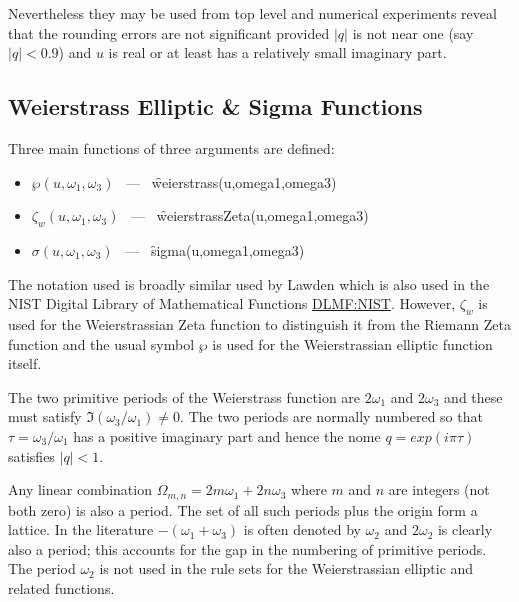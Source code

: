 Nevertheless they may be used from top level and numerical experiments reveal that the rounding
errors are not significant provided $|q|$ is not near one (say $|q|<0.9$)
and $u$ is real or at least has a relatively small imaginary part.

\subsection{Weierstrass Elliptic \& Sigma Functions}
Three main functions of three arguments are defined:
\hypertarget{WEIERSTRASS}{}
\hypertarget{WEIERSTRASSZETA}{}
\hypertarget{SIGMA}{}
\hypertarget{operator:SIGMA}{}
\hypertarget{operator:WEIERSTRASS}{}
\hypertarget{operator:WEIERSTRASSZETA}{}
 
\begin{itemize}
\item  $\wp(u, \omega_1, \omega_3)$ \ --- \ \f{weierstrass(u,omega1,omega3)}
\item $\zeta_w(u, \omega_1, \omega_3)$ \ --- \ \f{weierstrassZeta(u,omega1,omega3)}
\item $\sigma(u, \omega_1, \omega_3)$ \ --- \ \f{sigma(u,omega1,omega3)}
\end{itemize}

The notation used is broadly similar used by Lawden \cite{Lawden:89} which is also used in the
NIST Digital Library of Mathematical Functions \href{https://dlmf.nist.gov/}{DLMF:NIST}. However,
$\zeta_w$ is used for the Weierstrassian Zeta function to distinguish it from the Riemann Zeta
function and the usual symbol $\wp$ is used for the Weierstrassian elliptic function itself.

The two primitive periods of the Weierstrass function are $2\omega_1$ and $2\omega_3$ and these must satisfy
$\Im(\omega_3/\omega_1) \neq 0$. The two periods are normally numbered so that $\tau = \omega_3/\omega_1$ has
a positive imaginary part and hence the nome $q = exp(i\pi\tau)$ satisfies $|q| <1$.

Any linear combination $\Omega_{m,n} = 2m\omega_1 +2n\omega_3$ where $m$ and $n$ are
integers (not both zero) is also a period. The set of all such periods plus the origin form a lattice. In the literature
$-(\omega_1+\omega_3)$ is often denoted by $\omega_2$ and $2\omega_2$ is clearly also a period; this
accounts for the gap in the numbering of primitive periods. The period $\omega_2$ is not used in \REDUCE the rule sets for
the Weierstrassian elliptic and related functions.

